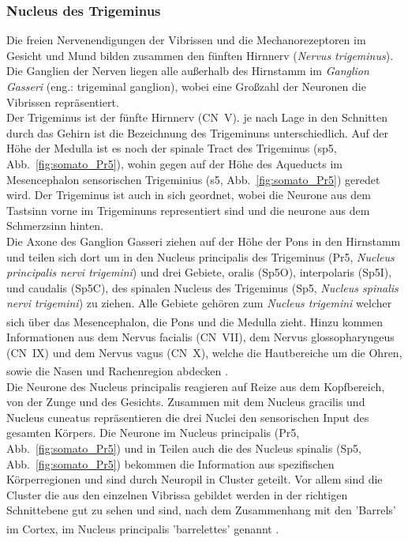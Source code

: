 \documentclass[12pt,a4paper,pdftex]{article}
\begin{document}
\subsubsection*{Nucleus des Trigeminus}
Die freien Nervenendigungen der Vibrissen und die Mechanorezeptoren im Gesicht und Mund bilden zusammen den fünften Hirnnerv (\textit{Nervus trigeminus}). Die Ganglien der Nerven liegen alle außerhalb des Hirnstamm im \textit{Ganglion Gasseri} (eng.: trigeminal ganglion), wobei eine Großzahl der Neuronen die Vibrissen repräsentiert.
\\
\noindent
Der Trigeminus ist der fünfte Hirnnerv (CN~V). je nach Lage in den Schnitten durch das Gehirn ist die Bezeichnung des Trigeminuns unterschiedlich. Auf der Höhe der Medulla ist es noch der spinale Tract des Trigeminus (sp5, Abb.~\ref{fig:somato_Pr5}), wohin gegen auf der Höhe des Aqueducts im Mesencephalon sensorischen Trigeminius (s5, Abb.~\ref{fig:somato_Pr5}) geredet wird. Der Trigeminus ist auch in sich geordnet, wobei die Neurone aus dem Tastsinn vorne im Trigeminuns representiert sind und die neurone aus dem Schmerzsinn hinten.
\\
\noindent
Die Axone des Ganglion Gasseri ziehen auf der Höhe der Pons in den Hirnstamm und teilen sich dort um in den Nucleus principalis des Trigeminus (Pr5, \textit{Nucleus principalis nervi trigemini})  und drei Gebiete, oralis (Sp5O), interpolaris (Sp5I), und caudalis (Sp5C), des spinalen Nucleus des Trigeminus (Sp5, \textit{Nucleus spinalis nervi trigemini}) zu ziehen. Alle Gebiete gehören zum \textit{Nucleus trigemini} welcher sich über das Mesencephalon, die Pons und die Medulla zieht\textsuperscript{\cite[5]{heldmaier2003tierphysiologie}}. 
Hinzu kommen Informationen aus dem Nervus facialis (CN~VII), dem Nervus glossopharyngeus (CN~IX) und dem Nervus vagus (CN~X), welche die Hautbereiche um die Ohren, sowie die Nasen und Rachenregion abdecken
\textsuperscript{\cite[12]{neurowissenschaften_baer}}.
\\
\noindent Die Neurone des Nucleus principalis reagieren auf Reize aus dem Kopfbereich, von der Zunge und des Gesichts. Zusammen mit dem Nucleus gracilis und Nucleus cuneatus repräsentieren die drei Nuclei den sensorischen Input des gesamten Körpers. Die Neurone im Nucleus principalis (Pr5, Abb.~\ref{fig:somato_Pr5}) und in Teilen auch die des Nucleus spinalis (Sp5, Abb.~\ref{fig:somato_Pr5}) bekommen die Information aus spezifischen Körperregionen und sind durch Neuropil in Cluster geteilt. Vor allem sind die Cluster die aus den einzelnen Vibrissa gebildet werden in der richtigen Schnittebene gut zu sehen und sind, nach dem Zusammenhang mit den 'Barrels' im Cortex, im Nucleus principalis 'barrelettes' genannt \textsuperscript{\cite[5]{heldmaier2003tierphysiologie}}.
\end{document}
